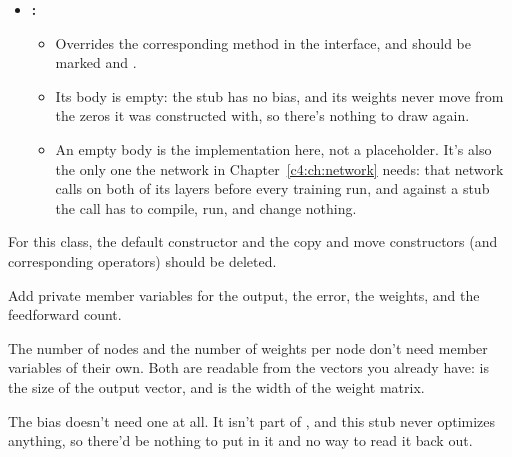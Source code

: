\begin{itemize}
\begin{itemize}
\begin{itemize}
      \item Returns nothing, and should be marked .
    \end{itemize}
    \item Neither is part of .
    \item {} in Chapter~\ref{c4:ch:network} performs one feedforward per training set
      per epoch, so this is what lets a test pin down the training loop:
    \begin{itemize}
      \item Nothing else can: a loop that runs a single pass instead of every epoch still lines up
        dimensionally and still returns , so without a count it's indistinguishable from
        a correct one.
    \end{itemize}
  \end{itemize}
  \item \textbf{:}
  \begin{itemize}
    \item Overrides the corresponding method in the interface, and should be marked
       and .
    \item Its body is empty: the stub has no bias, and its weights never move from the zeros it was
      constructed with, so there's nothing to draw again.
    \item An empty body is the implementation here, not a placeholder. It's also the only one the
      network in Chapter~\ref{c4:ch:network} needs: that network calls  on both
      of its layers before every training run, and against a stub the call has to compile, run, and
      change nothing.
  \end{itemize}
\end{itemize}
For this class, the default constructor and the copy and move constructors (and corresponding
operators) should be deleted.

Add private member variables for the output, the error, the weights, and the feedforward count.

The number of nodes and the number of weights per node don't need member variables of their own.
Both are readable from the vectors you already have:  is the size of the output
vector, and  is the width of the weight matrix.

The bias doesn't need one at all. It isn't part of , and this stub never optimizes
anything, so there'd be nothing to put in it and no way to read it back out.

